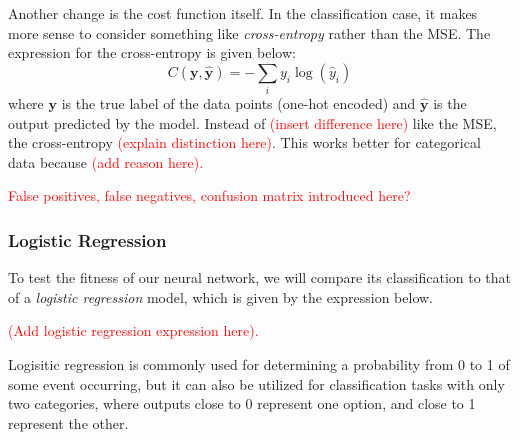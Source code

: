Another change is the cost function itself. In the classification case, it makes more sense to consider something like \emph{cross-entropy} rather than the MSE. The expression for the cross-entropy is given below:
\[ C(\boldsymbol y, \boldsymbol{\hat{y}}) = -\sum_{i} y_i \log(\hat{y}_i) \]
where $\boldsymbol y$ is the true label of the data points (one-hot encoded) and $\boldsymbol{\hat{y}}$ is the output predicted by the model. Instead of \textcolor{red}{(insert difference here)} like the MSE, the cross-entropy \textcolor{red}{(explain distinction here)}. This works better for categorical data because \textcolor{red}{(add reason here).}

\textcolor{red}{False positives, false negatives, confusion matrix introduced here?}

\subsubsection{Logistic Regression}
To test the fitness of our neural network, we will compare its classification to that of a \emph{logistic regression} model, which is given by the expression below.

\textcolor{red}{(Add logistic regression expression here).}

Logisitic regression is commonly used for determining a probability from 0 to 1 of some event occurring, but it can also be utilized for classification tasks with only two categories, where outputs close to 0 represent one option, and close to 1 represent the other. 

